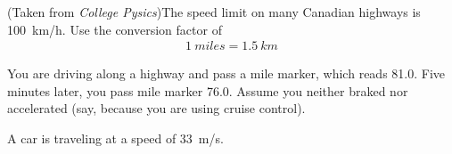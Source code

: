 \documentclass[12pt]{exam}
\begin{document}
\begin{questions}
\question
(Taken from \textit{College Pysics})The speed limit on many Canadian highways is 100~km/h. Use the conversion factor of
\begin{eqnarray}
	1~miles = 1.5~km
\end{eqnarray}

\question
You are driving along a highway and pass a mile marker, which reads 81.0. Five minutes later, you pass mile marker 76.0. Assume you neither braked nor accelerated (say, because you are using cruise control).

\question
A car is traveling at a speed of 33~m/s.

\end{questions}
\end{document}
